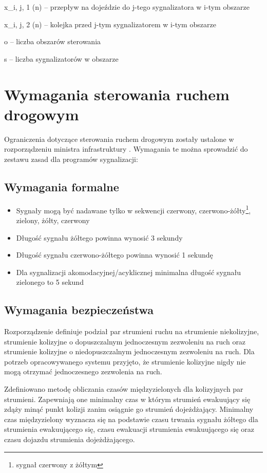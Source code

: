 x_{i, j, 1} (n) \textrm{ -- przepływ na dojeździe do j-tego sygnalizatora w i-tym obszarze}

x_{i, j, 2} (n) \textrm{ -- kolejka przed j-tym sygnalizatorem w i-tym obszarze}

o -- liczba obszarów sterowania

s -- liczba sygnalizatorów w obszarze

\section{Wymagania sterowania ruchem drogowym}
\label{sec:model_ograniczenia}
Ograniczenia dotyczące sterowania ruchem drogowym zostały ustalone w rozporządzeniu ministra infrastruktury \cite{rozporzadzenie}. Wymagania te można sprowadzić do zestawu zasad dla programów sygnalizacji:
\subsection{Wymagania formalne}
\begin{itemize}
	\item Sygnały mogą być nadawane tylko w sekwencji czerwony, czerwono-żółty\footnote{sygnał czerwony z żółtym}, zielony, żółty, czerwony
	\item Długość sygnału żółtego powinna wynosić 3 sekundy
	\item Długość sygnału czerwono-żółtego powinna wynosić 1 sekundę
	\item Dla sygnalizacji akomodacyjnej/acyklicznej minimalna długość sygnału zielonego to 5 sekund
\end{itemize}

\subsection{Wymagania bezpieczeństwa}
Rozporządzenie definiuje podział par strumieni ruchu na strumienie niekolizyjne, strumienie kolizyjne o dopuszczalnym jednoczesnym zezwoleniu na ruch oraz strumienie kolizyjne o niedopuszczalnym jednoczesnym zezwoleniu na ruch.
Dla potrzeb opracowywanego systemu przyjęto, że strumienie kolizyjne nigdy nie mogą otrzymać jednoczesnego zezwolenia na ruch.

Zdefiniowano metodę obliczania czasów międzyzielonych dla kolizyjnych par strumieni. Zapewniają one minimalny czas w którym strumień ewakuujący się zdąży minąć punkt kolizji zanim osiągnie go strumień dojeżdżający. Minimalny czas międzyzielony wyznacza się na podstawie czasu trwania sygnału żółtego dla strumienia ewakuującego się, czasu ewakuacji strumienia ewakuującego się oraz czasu dojazdu strumienia dojeżdżającego.

